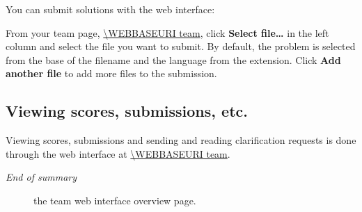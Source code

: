 You can submit solutions with%
the web interface:
\begin{description}[\breaklabel\setlabelstyle{\bfseries}]
\item[Web interface]
From your team page, \url{\WEBBASEURI team}, click \textbf{Select file\ldots} in the
left column and select the file you want to submit. By default,
the problem is selected from the base of the filename and the language
from the extension. Click \textbf{Add another file} to add more files to the
submission.
\end{description}

\subsection*{Viewing scores, submissions, etc.}

Viewing scores, submissions and sending and reading clarification
requests is done through the web interface at
\url{\WEBBASEURI team}.

\emph{End of summary}

\begin{figure}[p]
  \centering
  \caption{the team web interface overview page.}
  \label{fig:team-overview}
\end{figure}

